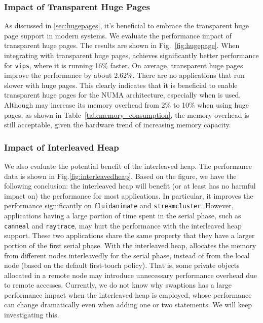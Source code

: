 \subsubsection{Impact of Transparent Huge Pages}

As discussed in \ref{sec:hugepages}, it's beneficial to embrace the transparent huge page support in modern systems. We evaluate the performance impact of transparent huge pages. The results are shown in Fig.~\ref{fig:hugepage}. When integrating with transparent huge pages, \NM{} achieves significantly better performance for \texttt{vips}, where it is running 16\% faster. On average, transparent huge pages improve the performance by about 2.62\%. There are no applications that run slower with huge pages. This clearly indicates that it is beneficial to enable transparent huge pages for the NUMA architecture, especially when \NM{} is used. 
Although \NM{} may increase its memory overhead from 2\% to 10\% when using huge pages, as shown in Table~\ref{tab:memory_consumption}, the memory overhead is still acceptable, given the hardware trend of increasing memory capacity.  


\subsubsection{Impact of Interleaved Heap} 
\label{sec:interleavedheap}

We also evaluate the potential benefit of the interleaved heap. The performance data is shown in Fig.\ref{fig:interleavedheap}. 
Based on the figure, we have the following conclusion: the interleaved heap will benefit (or at least has no harmful impact on) the performance for most applications. In particular, it improves the performance significantly on \texttt{fluidanimate} and \texttt{streamcluster}.  However, applications having a large portion of time spent in the serial phase, such as \texttt{canneal} and \texttt{raytrace}, may hurt the performance with the interleaved heap support. These two applications share the same property that they have a larger portion of the first serial phase. With the interleaved heap, \NM{} allocates the memory from different nodes interleavedly for the serial phase, instead of from the local node (based on the default first-touch policy). That is, some private objects allocated in a remote node may introduce unnecessary performance overhead due to remote accesses. Currently, we do not know why swaptions has a large performance impact when the interleaved heap is employed, whose performance can change dramatically even when adding one or two statements. We will keep investigating this. 

